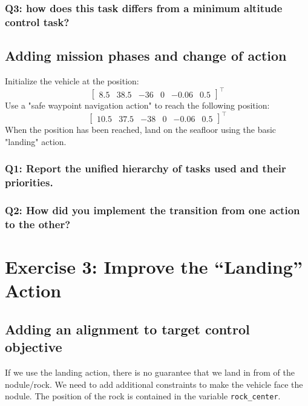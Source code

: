 \documentclass{article}
\begin{document}
\subsubsection{Q3: how does this task differs from a minimum altitude control task?}

\subsection{Adding mission phases and change of action}
Initialize the vehicle at the position:
\begin{displaymath}
\begin{bmatrix} 8.5 & 38.5 & -36 & 0 & -0.06 & 0.5 \end{bmatrix}^\top
\end{displaymath} 
Use a "safe waypoint navigation action" to reach the following position: 
\begin{displaymath}
\begin{bmatrix} 10.5 & 37.5 & -38 & 0 & -0.06 & 0.5 \end{bmatrix}^\top
\end{displaymath} 
When the position has been reached, land on the seafloor using the basic "landing" action.

\subsubsection{Q1: Report the unified hierarchy of tasks used and their priorities.}

\subsubsection{Q2: How did you implement the transition from one action to the other?}

\clearpage

\section{Exercise 3: Improve the “Landing” Action}
\subsection{Adding an alignment to target control objective}
If we use the landing action, there is no guarantee that we land in from of the nodule/rock. We need to add additional constraints to make the vehicle face the nodule. The position of the rock is contained in the variable \texttt{rock\_center}. 
\end{document}
